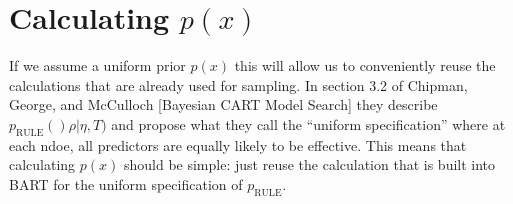 \documentclass[12pt]{article}
\begin{document}
\section{Calculating $p(x)$}
If we assume a uniform prior $p(x)$ this will allow us to conveniently reuse the calculations that are already
used for sampling. In section 3.2 of Chipman, George, and McCulloch [Bayesian CART Model Search] they describe 
$p_{\mbox{RULE}}()\rho | \eta, T)$ and propose what they call the ``uniform specification'' where
at each ndoe, all predictors are equally likely to be effective. This means that calculating $p(x)$ should
be simple: just reuse the calculation that is built into BART for the uniform specification of $p_{\mbox{RULE}}$.
\end{document}
